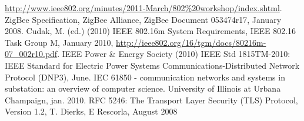 \begin{thebibliography}{99}
 \url{http://www.ieee802.org/minutes/2011-March/802\%20workshop/index.shtml}.
 ZigBee Specification, ZigBee Alliance, ZigBee Document 053474r17, January 2008.
 Cudak, M. (ed.) (2010) IEEE 802.16m System Requirements, IEEE 802.16 Task Group M, January 2010, \url{http://ieee802.org/16/tgm/docs/80216m-07_002r10.pdf}.
 IEEE Power \& Energy Society (2010) IEEE Std 1815TM-2010: IEEE Standard for Electric Power Systems Communications-Distributed Network Protocol (DNP3), June.
 IEC 61850 - communication networks and systems in substation: an overview of computer science.
University of Illinois at Urbana Champaign, jan. 2010. %
 RFC 5246: The Transport Layer Security (TLS) Protocol, Version 1.2, T. Dierks, E Rescorla, August 2008
\end{thebibliography}